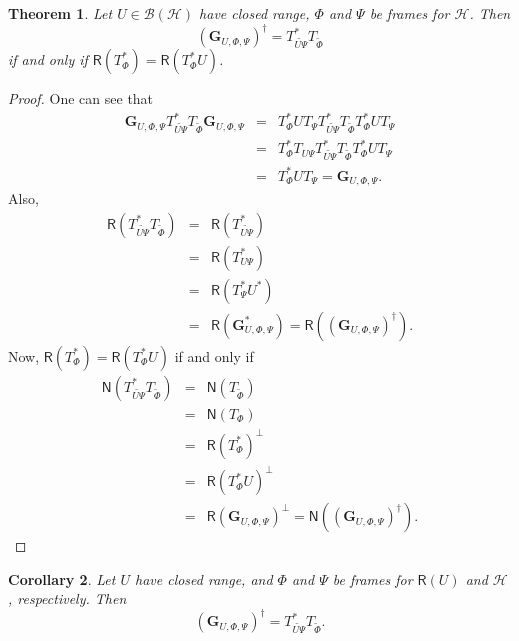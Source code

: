 \documentclass{birkjour}
\newtheorem{thm}{Theorem}[section]
\newtheorem{cor}[thm]{Corollary}
\theoremstyle{definition}
\theoremstyle{remark}
\numberwithin{equation}{section}
\newcommand{\range}[1]{\mathsf{R}\left( #1 \right)}
\newcommand{\kernel}[1]{\mathsf{N}\left( #1 \right)}
\def\Hil{\mathcal{H}}
\newcommand{\BL}[1]{
{\mathcal B} \left( #1 \right)
}
\begin{document}
\begin{thm}
Let $U\in \BL{\Hil}$ have closed range, $\Phi$ and $\Psi$ be
frames for $\Hil$. Then
$$\left(\mathbf{G}_{U,\Phi,\Psi}\right)^{\dagger}=T_{\widetilde{U\Psi}}^*T_{\widetilde{\Phi}}$$
if and only if $\range{T_{\Phi}^*}=\range{T_{\Phi}^*U}$.
\end{thm}
\begin{proof}
One can see that
\begin{eqnarray*}
\mathbf{G}_{U,\Phi,\Psi}T_{\widetilde{U\Psi}}^*T_{\widetilde{\Phi}}
\mathbf{G}_{U,\Phi,\Psi}&=&T_{\Phi}^*UT_{\Psi}T_{\widetilde{U\Psi}}^*T_{\widetilde{\Phi}}
T_{\Phi}^*UT_{\Psi} \\
&=&T_{\Phi}^*T_{U\Psi}T_{\widetilde{U\Psi}}^*T_{\widetilde{\Phi}}
T_{\Phi}^*UT_{\Psi}\\
&=&T_{\Phi}^*UT_{\Psi}=\mathbf{G}_{U,\Phi,\Psi}.
\end{eqnarray*}
Also,
\begin{eqnarray*}
\range{T_{\widetilde{U\Psi}}^*T_{\widetilde{\Phi}}}&=&
\range{T_{\widetilde{U\Psi}}^*} \\
&=&\range{T_{U\Psi}^*}\\
&=&\range{T_{\Psi}^*U^*}\\
&=&\range{\mathbf{G}_{U,\Phi,\Psi}^*}=\range{\left(\mathbf{G}_{U,\Phi,\Psi}\right)^{\dagger}}.
\end{eqnarray*}
Now,  $\range{T_{\Phi}^*}=\range{T_{\Phi}^*U}$ if and only if
\begin{eqnarray*}
\kernel{T_{\widetilde{U\Psi}}^*T_{\widetilde{\Phi}}}&=&\kernel{T_{\widetilde{\Phi}}}\\
&=&\kernel{T_{\Phi}}\\
&=&\range{T_{\Phi}^*}^{\perp}\\
&=&\range{T_{\Phi}^*U}^{\perp}\\
&=&\range{\mathbf{G}_{U,\Phi,\Psi}}^{\perp}=\kernel{\left(\mathbf{G}_{U,\Phi,\Psi}\right)^{\dagger}}.
\end{eqnarray*}
\end{proof}
\begin{cor}{\label{pseudo3}}
Let $U$ have closed range, and $\Phi$ and $\Psi$ be frames for $\range{U}$ and $\Hil$, respectively. Then
$$\left(\mathbf{G}_{U,\Phi,\Psi}\right)^{\dagger}=T_{\widetilde{U\Psi}}^*T_{\widetilde{\Phi}}.$$
\end{cor}
\end{document}
